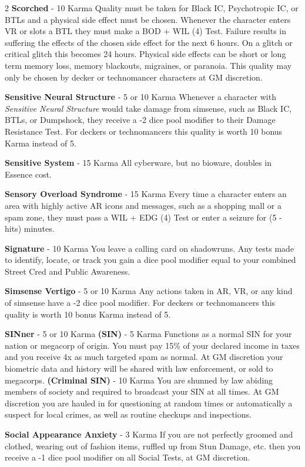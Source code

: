 \documentclass[
  oneside]{article}
\begin{document}
\begin{multicols}{2}
\textbf{Scorched} - 10 Karma Quality must be taken
for Black IC, Psychotropic IC, or BTLs and a
physical side effect must be chosen. Whenever the
character enters VR or slots a BTL they must make
a BOD + WIL (4) Test. Failure results in suffering
the effects of the chosen side effect for the next
6 hours. On a glitch or critical glitch this
becomes 24 hours. Physical side effects can be
short or long term memory loss, memory blackouts,
migraines, or paranoia. This quality may only be
chosen by decker or technomancer characters at GM
discretion.

\textbf{Sensitive Neural Structure} - 5 or 10
Karma Whenever a character with \emph{Sensitive
Neural Structure} would take damage from simsense,
such as Black IC, BTLs, or Dumpshock, they receive
a -2 dice pool modifier to their Damage Resistance
Test. For deckers or technomancers this quality is
worth 10 bonus Karma instead of 5.

\textbf{Sensitive System} - 15 Karma All
cyberware, but no bioware, doubles in Essence
cost.

\textbf{Sensory Overload Syndrome} - 15 Karma
Every time a character enters an area with highly
active AR icons and messages, such as a shopping
mall or a spam zone, they must pass a WIL + EDG
(4) Test or enter a seizure for (5 - hits)
minutes.

\textbf{Signature} - 10 Karma You leave a calling
card on shadowruns. Any tests made to identify,
locate, or track you gain a dice pool modifier
equal to your combined Street Cred and Public
Awareness.

\textbf{Simsense Vertigo} - 5 or 10 Karma Any
actions taken in AR, VR, or any kind of simsense
have a -2 dice pool modifier. For deckers or
technomancers this quality is worth 10 bonus Karma
instead of 5.

\textbf{SINner} - 5 or 10 Karma \textbf{(SIN)} - 5
Karma Functions as a normal SIN for your nation or
megacorp of origin. You must pay 15\% of your
declared income in taxes and you receive 4x as
much targeted spam as normal. At GM discretion
your biometric data and history will be shared
with law enforcement, or sold to megacorps.
\textbf{(Criminal SIN)} - 10 Karma You are shunned
by law abiding members of society and required to
broadcast your SIN at all times. At GM discretion
you are hauled in for questioning at random times
or automatically a suspect for local crimes, as
well as routine checkups and inspections.

\textbf{Social Appearance Anxiety} - 3 Karma If
you are not perfectly groomed and clothed, wearing
out of fashion items, ruffled up from Stun Damage,
etc. then you receive a -1 dice pool modifier on
all Social Tests, at GM discretion.


\end{multicols}
\end{document}
